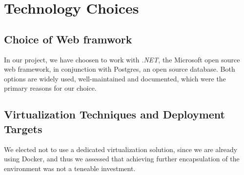 
\section{Technology Choices}

\subsection{Choice of Web framwork}
In our project, we have choosen to work with \textit{.NET}, the Microsoft open source web framework, in conjunction with Postgres, an open source database.
Both options are widely used, well-maintained and documented, which were the primary reasons for our choice.




\subsection{Virtualization Techniques and Deployment Targets}

We elected not to use a dedicated virtualization solution,
since we are already using Docker, and thus we assessed that achieving further encapsulation of the environment was not a teneable investment.

